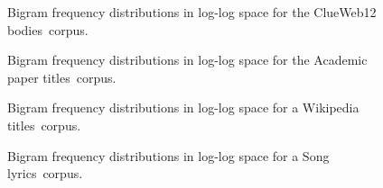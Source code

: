 \documentclass[11pt]{report}
\newcommand{\classificationPaper}{Song lyrics}
\newcommand{\Wikipedia}{Wikipedia titles}
\newcommand{\AcademicID}{Academic paper titles}
\newcommand{\clueWebBodiesLarge}{ClueWeb12 bodies}
\newcommand{\PP}{Imagefiles}
\begin{document}
\begin{figure}[p]
\centering

\caption{Bigram frequency distributions in log-log space for the
  \clueWebBodiesLarge~corpus.
\label{fitCWB}}
\end{figure}


\begin{figure}[p]
\centering

\caption{Bigram frequency distributions in log-log space for the
  \AcademicID~corpus.
\label{fitAC}}
\end{figure}


\begin{figure}[p]
\centering

\caption{Bigram frequency distributions in log-log space for a
  \Wikipedia~corpus. 
\label{fitWK}}
\end{figure}


\begin{figure}[p]
\centering

\caption{Bigram frequency distributions in log-log space for a
  \classificationPaper~corpus. 
\label{fitCP}}
\end{figure}
\end{document}
